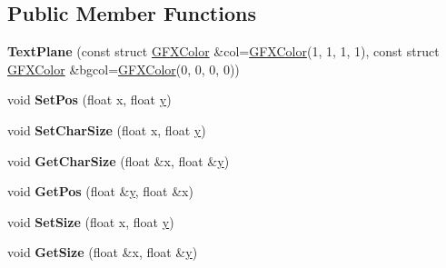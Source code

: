 \subsection*{Public Member Functions}
\begin{DoxyCompactItemize}
\item 
{\bfseries Text\+Plane} (const struct \hyperlink{structGFXColor}{G\+F\+X\+Color} \&col=\hyperlink{structGFXColor}{G\+F\+X\+Color}(1, 1, 1, 1), const struct \hyperlink{structGFXColor}{G\+F\+X\+Color} \&bgcol=\hyperlink{structGFXColor}{G\+F\+X\+Color}(0, 0, 0, 0))\hypertarget{classTextPlane_a6045d91f6e2033bac0033ca44b6be18c}{}\label{classTextPlane_a6045d91f6e2033bac0033ca44b6be18c}

\item 
void {\bfseries Set\+Pos} (float x, float \hyperlink{IceUtils_8h_aa7ffaed69623192258fb8679569ff9ba}{y})\hypertarget{classTextPlane_ad573c39b9a9e789dfb01e19068d54917}{}\label{classTextPlane_ad573c39b9a9e789dfb01e19068d54917}

\item 
void {\bfseries Set\+Char\+Size} (float x, float \hyperlink{IceUtils_8h_aa7ffaed69623192258fb8679569ff9ba}{y})\hypertarget{classTextPlane_ad38b9b7a1e9a222b597fe299bb031214}{}\label{classTextPlane_ad38b9b7a1e9a222b597fe299bb031214}

\item 
void {\bfseries Get\+Char\+Size} (float \&x, float \&\hyperlink{IceUtils_8h_aa7ffaed69623192258fb8679569ff9ba}{y})\hypertarget{classTextPlane_a6132b26142631776ea1035496b17eb89}{}\label{classTextPlane_a6132b26142631776ea1035496b17eb89}

\item 
void {\bfseries Get\+Pos} (float \&\hyperlink{IceUtils_8h_aa7ffaed69623192258fb8679569ff9ba}{y}, float \&x)\hypertarget{classTextPlane_a159009c934d071ca1b86cbe8f761dae3}{}\label{classTextPlane_a159009c934d071ca1b86cbe8f761dae3}

\item 
void {\bfseries Set\+Size} (float x, float \hyperlink{IceUtils_8h_aa7ffaed69623192258fb8679569ff9ba}{y})\hypertarget{classTextPlane_a561e181bbda36e52934087fc47510d33}{}\label{classTextPlane_a561e181bbda36e52934087fc47510d33}

\item 
void {\bfseries Get\+Size} (float \&x, float \&\hyperlink{IceUtils_8h_aa7ffaed69623192258fb8679569ff9ba}{y})\hypertarget{classTextPlane_a560f7c3d17527bbbca903f95dd3cfe8e}{}\label{classTextPlane_a560f7c3d17527bbbca903f95dd3cfe8e}


\end{DoxyCompactItemize}
